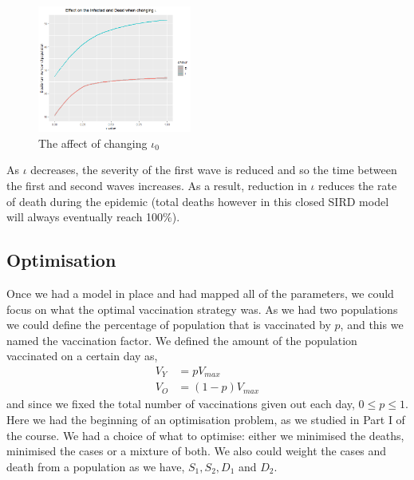 \documentclass{article}
\begin{document}
\newpage
\begin{figure}[ht!]
\begin{center}
      \includegraphics[width=0.45\textwidth]{./figures/MarioPlt/iInfded.png}
      \end{center}
\caption{The affect of changing $\iota_0$}
\end{figure}

\noindent
As $\iota$ decreases, the severity of the first wave is reduced and so the time between the first and second waves increases. As a result, reduction in $\iota$ reduces the rate of death during the epidemic (total deaths however in this closed SIRD model will always eventually reach 100\%).








\newpage
\subsection{Optimisation}
Once we had a model in place and had mapped all of the parameters, we could focus on what the optimal vaccination strategy was. As we had two populations we could define the percentage of population that is vaccinated by $p$, and this we named the vaccination factor. We defined the amount of the population vaccinated on a certain day as,
\begin{align*}
    V_Y &= p V_{max} \\
    V_O &= (1 - p)V_{max}
\end{align*}
and since we fixed the total number of vaccinations given out each day, $0 \le p \le 1$. Here we had the beginning of an optimisation problem, as we studied in Part I of the course. We had a choice of what to optimise: either we minimised the deaths, minimised the cases or a mixture of both. We also could weight the cases and death from a population as we have, $S_1, S_2, D_1$ and $D_2$.\\
\end{document}
